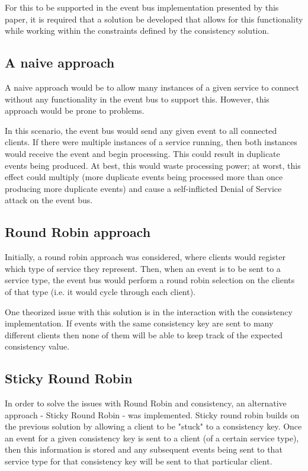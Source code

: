 \documentclass{l3proj}
\begin{document}
For this to be supported in the event bus implementation presented by this paper, it is required that a solution be developed that allows for this functionality while working within the constraints defined by the consistency solution.

\subsection{A naive approach}
A naive approach would be to allow many instances of a given service to connect without any functionality in the event bus to support this. However, this approach would be prone to problems.

In this scenario, the event bus would send any given event to all connected clients. If there were multiple instances of a service running, then both instances would receive the event and begin processing. This could result in duplicate events being produced. At best, this would waste processing power; at worst, this effect could multiply (more duplicate events being processed more than once producing more duplicate events) and cause a self-inflicted Denial of Service attack on the event bus.

\subsection{Round Robin approach}
Initially, a round robin approach was considered, where clients would register which type of service they represent. Then, when an event is to be sent to a service type, the event bus would perform a round robin selection on the clients of that type (i.e. it would cycle through each client).

One theorized issue with this solution is in the interaction with the consistency implementation. If events with the same consistency key are sent to many different clients then none of them will be able to keep track of the expected consistency value.

\subsection{Sticky Round Robin}
In order to solve the issues with Round Robin and consistency, an alternative approach - Sticky Round Robin - was implemented. Sticky round robin builds on the previous solution by allowing a client to be "stuck" to a consistency key. Once an event for a given consistency key is sent to a client (of a certain service type), then this information is stored and any subsequent events being sent to that service type for that consistency key will be sent to that particular client.
\end{document}
